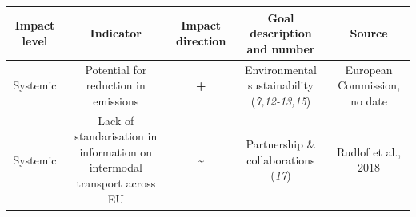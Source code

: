 \documentclass[
]{book}
\begin{document}
\begin{longtable}[]{@{}ccccc@{}}
\toprule
\begin{minipage}[b]{0.17\columnwidth}\centering
Impact level\strut
\end{minipage} & \begin{minipage}[b]{0.16\columnwidth}\centering
Indicator\strut
\end{minipage} & \begin{minipage}[b]{0.17\columnwidth}\centering
Impact direction\strut
\end{minipage} & \begin{minipage}[b]{0.17\columnwidth}\centering
Goal description and number\strut
\end{minipage} & \begin{minipage}[b]{0.17\columnwidth}\centering
Source\strut
\end{minipage}\tabularnewline
\midrule
\endhead
\begin{minipage}[t]{0.17\columnwidth}\centering
Systemic\strut
\end{minipage} & \begin{minipage}[t]{0.16\columnwidth}\centering
Potential for reduction in emissions\strut
\end{minipage} & \begin{minipage}[t]{0.17\columnwidth}\centering
\textbf{+}\strut
\end{minipage} & \begin{minipage}[t]{0.17\columnwidth}\centering
Environmental sustainability (\emph{7,12-13,15})\strut
\end{minipage} & \begin{minipage}[t]{0.17\columnwidth}\centering
European Commission, no date\strut
\end{minipage}\tabularnewline
\begin{minipage}[t]{0.17\columnwidth}\centering
Systemic\strut
\end{minipage} & \begin{minipage}[t]{0.16\columnwidth}\centering
Lack of standarisation in information on intermodal transport across EU\strut
\end{minipage} & \begin{minipage}[t]{0.17\columnwidth}\centering
\textbf{\textasciitilde{}}\strut
\end{minipage} & \begin{minipage}[t]{0.17\columnwidth}\centering
Partnership \& collaborations (\emph{17})\strut
\end{minipage} & \begin{minipage}[t]{0.17\columnwidth}\centering
Rudlof et al., 2018\strut
\end{minipage}\tabularnewline
\bottomrule
\end{longtable}
\end{document}
